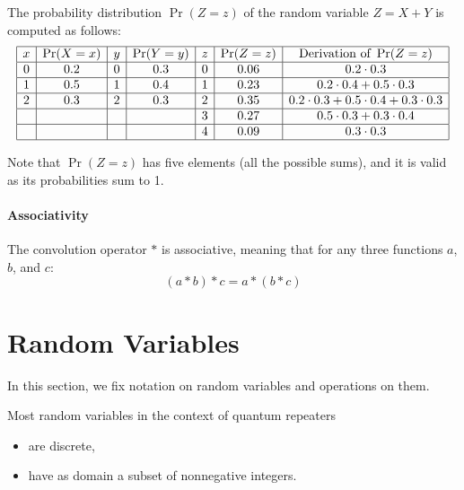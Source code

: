 \documentclass{masterthesis}
\begin{document}
The probability distribution $\Pr(Z = z)$ of the random variable $Z = X + Y$ is computed as follows:
\begin{equation*}
    \begin{array}{|c|c|c|c|c|c|c|}
        \hline
        x & \Pr(X = x) & y & \Pr(Y = y) & z & \Pr(Z = z) & \text{Derivation of }\Pr(Z = z)\\
        \hline
        0 & 0.2 & 0 & 0.3 & 0 & 0.06 & 0.2 \cdot 0.3 \\
        \hline
        1 & 0.5 & 1 & 0.4 & 1 & 0.23 & 0.2 \cdot 0.4 + 0.5 \cdot 0.3 \\
        \hline
        2 & 0.3 & 2 & 0.3 & 2 & 0.35 & 0.2 \cdot 0.3 + 0.5 \cdot 0.4 + 0.3 \cdot 0.3 \\
        \hline
         &  &  &  & 3 & 0.27 & 0.5 \cdot 0.3 + 0.3 \cdot 0.4 \\
        \hline
         &  &  &  & 4 & 0.09 & 0.3 \cdot 0.3 \\
        \hline
    \end{array}
\end{equation*}

Note that $\Pr(Z = z)$ has five elements (all the possible sums), and it is valid as its probabilities sum to 1.

\paragraph*{Associativity}
\begin{samepage}
    The convolution operator \( * \) is associative, meaning that for any three functions \(a\), \(b\), and \(c\):
    \begin{equation}\label{eq:convolution_associativity} 
        (a * b) * c = a * (b * c)
    \end{equation}        
\end{samepage}

\section*{Random Variables}

In this section, we fix notation on random variables and operations on them. 

Most random variables in the context of quantum repeaters
\begin{itemize}
    \item are discrete,
    \item have as domain a subset of nonnegative integers.
\end{itemize}
\end{document}
